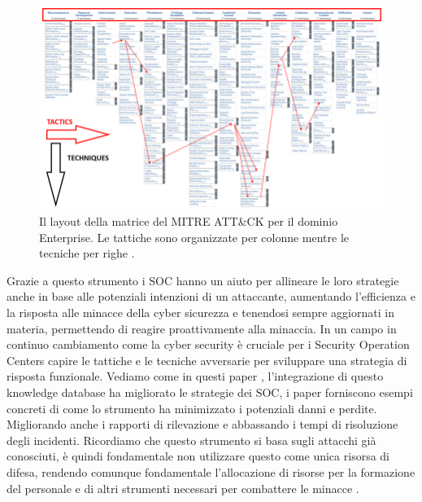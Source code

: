              \begin{figure}[H]
                \centering
                \includegraphics[width=1.0\textwidth]{Immagini/mitre_att_ck_matrix.png}
                \caption{Il layout della matrice del MITRE ATT\&CK per il dominio Enterprise\protect\footnotemark. Le tattiche sono organizzate per colonne mentre le tecniche per righe \cite{mitre_attck_matrix_pic_paper}.}
                \label{fig:mitre_att_ck_matrix}
            \end{figure}

            Grazie a questo strumento i SOC hanno un aiuto per allineare le loro strategie anche in base alle potenziali intenzioni di un attaccante, aumentando l'efficienza e la risposta alle minacce della cyber sicurezza e tenendosi sempre aggiornati in materia, permettendo di reagire proattivamente alla minaccia.
           In un campo in continuo cambiamento come la cyber security è cruciale per i Security Operation Centers capire le tattiche e le tecniche avversarie per sviluppare una strategia di risposta funzionale. Vediamo come in questi paper \cite{paper_esempi_concreti_diminuzione_danni_potenziali_n3}, \cite{paper_esempi_concreti_diminuzione_danni_potenziali_n4} l'integrazione di questo knowledge database ha migliorato le strategie dei SOC, i paper forniscono esempi concreti di come lo strumento ha minimizzato i potenziali danni e perdite. Migliorando anche i rapporti di rilevazione e abbassando i tempi di risoluzione degli incidenti. Ricordiamo che questo strumento si basa sugli attacchi già conosciuti, è quindi fondamentale non utilizzare questo come unica risorsa di difesa, rendendo comunque fondamentale l'allocazione di risorse per la formazione del personale e di altri strumenti necessari per combattere le minacce \cite{mitre_attck_matrix_pic_paper}.
        

